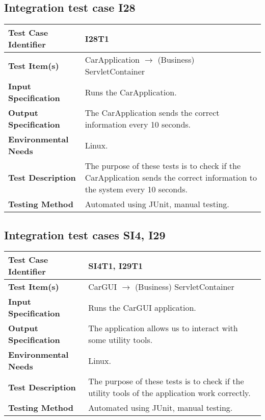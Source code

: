 \vspace{2em}

\subsection {Integration test case I28}

\indent

\vspace{1em}

\begin{tabular}{l p{}}
    \hline
    \textbf{Test Case Identifier} & I28T1\\
    \hline
    \textbf{Test Item(s)} & CarApplication $\rightarrow$ (Business) ServletContainer \\
    \hline
    \textbf{Input Specification} &  Runs the CarApplication. \\
    \hline
    \textbf{Output Specification} &  The CarApplication sends the correct information every 10 seconds.  \\
    \hline
    \textbf{Environmental Needs} & Linux. \\
    \hline
    \textbf{Test Description} & The purpose of these tests is to check if the CarApplication sends the correct information to the system every 10 seconds.  \\
    \hline
    \textbf{Testing Method} & Automated using JUnit, manual testing. \\
    \hline
\end{tabular}

\vspace{2em}

\subsection {Integration test cases SI4, I29}

\indent

\vspace{1em}

\begin{tabular}{l p{}}
    \hline
    \textbf{Test Case Identifier} & SI4T1, I29T1\\
    \hline
    \textbf{Test Item(s)} & CarGUI $\rightarrow$ (Business) ServletContainer \\
    \hline
    \textbf{Input Specification} &   Runs the CarGUI application. \\
    \hline
    \textbf{Output Specification} &  The application allows us to interact with some utility tools.  \\
    \hline
    \textbf{Environmental Needs} & Linux. \\
    \hline
    \textbf{Test Description} & The purpose of these tests is to check if the utility tools of the application work correctly.  \\
    \hline
    \textbf{Testing Method} & Automated using JUnit, manual testing. \\
    \hline
\end{tabular}

\vspace{2em}